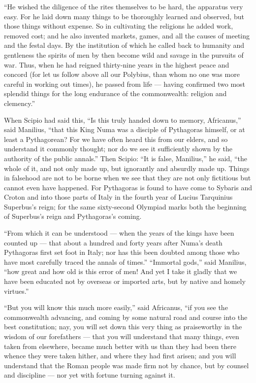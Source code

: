  ``He wished the diligence of the rites themselves to be hard, the apparatus very easy. For he laid down many things to be thoroughly learned and observed, but those things without expense. So in cultivating the religions he added work, removed cost; and he also invented markets, games, and all the causes of meeting and the festal days. By the institution of which he called back to humanity and gentleness the spirits of men by then become wild and savage in the pursuits of war. Thus, when he had reigned thirty-nine years in the highest peace and concord (for let us follow above all our Polybius, than whom no one was more careful in working out times), he passed from life --- having confirmed two most splendid things for the long endurance of the commonwealth: religion and clemency.''

 When Scipio had said this, ``Is this truly handed down to memory, Africanus,'' said Manilius, ``that this King Numa was a disciple of Pythagoras himself, or at least a Pythagorean? For we have often heard this from our elders, and so understand it commonly thought; nor do we see it sufficiently shown by the authority of the public annals.'' Then Scipio: ``It is false, Manilius,'' he said, ``the whole of it, and not only made up, but ignorantly and absurdly made up. Things in falsehood are not to be borne when we see that they are not only fictitious but cannot even have happened. For Pythagoras is found to have come to Sybaris and Croton and into those parts of Italy in the fourth year of Lucius Tarquinius Superbus's reign; for the same sixty-second Olympiad marks both the beginning of Superbus's reign and Pythagoras's coming.

 ``From which it can be understood --- when the years of the kings have been counted up --- that about a hundred and forty years after Numa's death Pythagoras first set foot in Italy; nor has this been doubted among those who have most carefully traced the annals of times.'' ``Immortal gods,'' said Manilius, ``how great and how old is this error of men! And yet I take it gladly that we have been educated not by overseas or imported arts, but by native and homely virtues.''

 ``But you will know this much more easily,'' said Africanus, ``if you see the commonwealth advancing, and coming by some natural road and course into the best constitution; nay, you will set down this very thing as praiseworthy in the wisdom of our forefathers --- that you will understand that many things, even taken from elsewhere, became much better with us than they had been there whence they were taken hither, and where they had first arisen; and you will understand that the Roman people was made firm not by chance, but by counsel and discipline --- nor yet with fortune turning against it.

